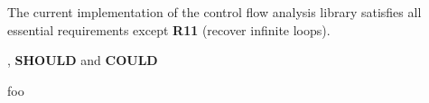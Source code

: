 The current implementation of the control flow analysis library satisfies all essential requirements except \textbf{R11} (recover infinite loops).

, \textbf{SHOULD} and \textbf{COULD}





foo

